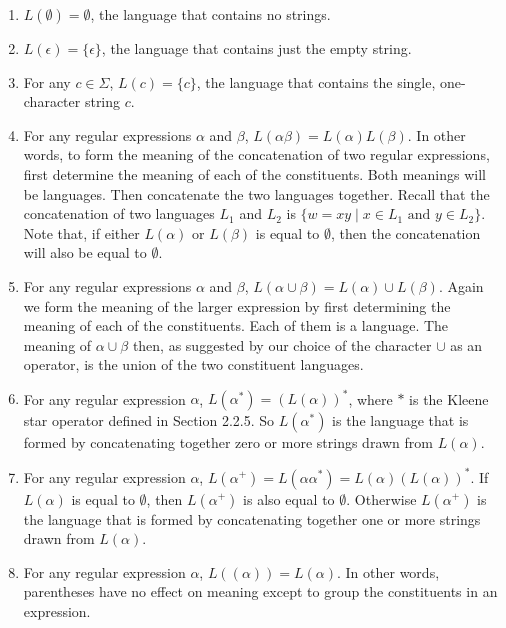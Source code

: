 \documentclass[hidelinks,12pt]{article}
\begin{document}
\begin{enumerate}
    \item \( L(\emptyset) = \emptyset \), the language that contains no strings.
    \item \( L(\epsilon) = \{\epsilon\} \), the language that contains just the empty string.
    \item For any \( c \in \Sigma \), \( L(c) = \{c\} \), the language that contains the single, one-character string \( c \).
    \item For any regular expressions \( \alpha \) and \( \beta \), \( L(\alpha \beta) = L(\alpha) L(\beta) \). In other words, to form the meaning of the concatenation of two regular expressions, first determine the meaning of each of the constituents. Both meanings will be languages. Then concatenate the two languages together. Recall that the concatenation of two languages \( L_1 \) and \( L_2 \) is \( \{ w = xy \mid x \in L_1 \text{ and } y \in L_2 \} \). Note that, if either \( L(\alpha) \) or \( L(\beta) \) is equal to \( \emptyset \), then the concatenation will also be equal to \( \emptyset \).
    \item For any regular expressions \( \alpha \) and \( \beta \), \( L(\alpha \cup \beta) = L(\alpha) \cup L(\beta) \). Again we form the meaning of the larger expression by first determining the meaning of each of the constituents. Each of them is a language. The meaning of \( \alpha \cup \beta \) then, as suggested by our choice of the character \( \cup \) as an operator, is the union of the two constituent languages.
    \item For any regular expression \( \alpha \), \( L(\alpha^*) = (L(\alpha))^* \), where \( * \) is the Kleene star operator defined in Section 2.2.5. So \( L(\alpha^*) \) is the language that is formed by concatenating together zero or more strings drawn from \( L(\alpha) \).
    \item For any regular expression \( \alpha \), \( L(\alpha^+) = L(\alpha \alpha^*) = L(\alpha) (L(\alpha))^* \). If \( L(\alpha) \) is equal to \( \emptyset \), then \( L(\alpha^+) \) is also equal to \( \emptyset \). Otherwise \( L(\alpha^+) \) is the language that is formed by concatenating together one or more strings drawn from \( L(\alpha) \).
    \item For any regular expression \( \alpha \), \( L((\alpha)) = L(\alpha) \). In other words, parentheses have no effect on meaning except to group the constituents in an expression.
\end{enumerate}
\end{document}
